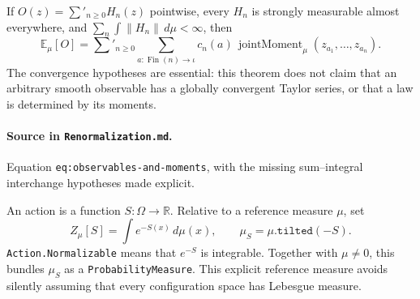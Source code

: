 \begin{theorem}
\label{thm:renorm:expectationMomentExpansion}
If $O(z)=\sum'_{n\geq0}H_n(z)$ pointwise, every $H_n$ is strongly measurable almost everywhere,
and $\sum_n\int\lVert H_n\rVert\,d\mu<\infty$, then
\[
 \mathbb E_\mu[O]
 =\sum'_{n\geq0}\sum_{a:\operatorname{Fin}(n)\to\iota}
   c_n(a)\,\operatorname{jointMoment}_\mu(z_{a_1},\ldots,z_{a_n}).
\]
The convergence hypotheses are essential: this theorem does not claim that an arbitrary smooth
observable has a globally convergent Taylor series, or that a law is determined by its moments.

\paragraph{Source in \texttt{Renormalization.md}.}
Equation \texttt{eq:observables-and-moments}, with the missing sum--integral interchange hypotheses
made explicit.
\end{theorem}

\begin{definition}
\label{def:renorm:action}
An action is a function $S:\Omega\to\mathbb R$.  Relative to a reference measure $\mu$, set
\[
 Z_\mu[S]=\int e^{-S(x)}\,d\mu(x),\qquad
 \mu_S=\mu.\texttt{tilted}(-S).
\]
\texttt{Action.Normalizable} means that $e^{-S}$ is integrable.  Together with
$\mu\neq0$, this bundles $\mu_S$ as a \texttt{ProbabilityMeasure}.  This explicit reference
measure avoids silently assuming that every configuration space has Lebesgue measure.
\end{definition}

